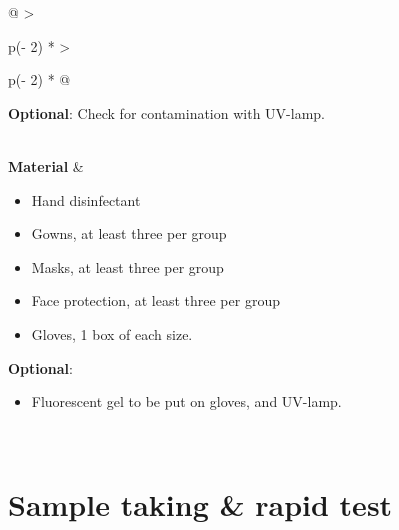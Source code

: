 \documentclass[
]{book}
\providecommand{\tightlist}{%
  \setlength{\itemsep}{0pt}\setlength{\parskip}{0pt}}
\begin{document}
\begin{longtable}[]{@{}
  >{\raggedright\arraybackslash}p{(\columnwidth - 2\tabcolsep) * }
  >{\raggedright\arraybackslash}p{(\columnwidth - 2\tabcolsep) * }@{}}
\begin{minipage}[t]{\linewidth}
\textbf{Optional}: Check for contamination
with UV-lamp.
\end{minipage} \\
\textbf{Material} & \begin{minipage}[t]{\linewidth}\raggedright
\begin{itemize}
\item
  Hand disinfectant
\item
  Gowns, at least three per group
\item
  Masks, at least three per group
\item
  Face protection, at least three per group
\item
  Gloves, 1 box of each size.
\end{itemize}

\textbf{Optional}:

\begin{itemize}
\tightlist
\item
  Fluorescent gel to be put on gloves, and UV-lamp.
\end{itemize}
\end{minipage} \\
\bottomrule
\end{longtable}

\hypertarget{sample-taking-rapid-test}{%
\section{Sample taking \& rapid test}\label{sample-taking-rapid-test}}
\end{document}
